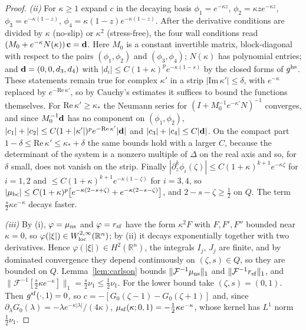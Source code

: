 \begin{proof}
\emph{(ii)} For $\kappa\ge1$ expand $c$ in the decaying basis $\phi_1=e^{-\kappa z}$, $\phi_2=\kappa ze^{-\kappa z}$,
$\phi_3=e^{-\kappa(1-z)}$, $\phi_4=\kappa(1-z)e^{-\kappa(1-z)}$. After the derivative conditions are divided by
$\kappa$ (no-slip) or $\kappa^2$ (stress-free), the four wall conditions read $(M_0+e^{-\kappa}N(\kappa))\,{\bf c}=
{\bf d}$. Here $M_0$ is a constant invertible matrix, block-diagonal with respect to the pairs
$(\phi_1,\phi_2)$ and $(\phi_3,\phi_4)$; $N(\kappa)$ has polynomial entries; and ${\bf d}=(0,0,d_3,d_4)$ with
$|d_i|\le C(1+\kappa)^pe^{-\kappa(1-s)}$ by the closed forms of $g^{\rm hs}$. These statements remain true for
complex $\kappa'$ in a strip $|\mathrm{Im}\,\kappa'|\le\delta$, with $e^{-\kappa}$ replaced by $e^{-\mathrm{Re}\,\kappa'}$,
so by Cauchy's estimates it suffices to bound the functions themselves. For $\mathrm{Re}\,\kappa'\ge\kappa_*$ the
Neumann series for $(I+M_0^{-1}e^{-\kappa'}N)^{-1}$ converges, and since $M_0^{-1}{\bf d}$ has no component on
$(\phi_1,\phi_2)$, $|c_1|+|c_2|\le C(1+|\kappa'|)^pe^{-\mathrm{Re}\,\kappa'}|{\bf d}|$ and $|c_3|+|c_4|\le C|{\bf d}|$.
On the compact part $1-\delta\le\mathrm{Re}\,\kappa'\le\kappa_*+\delta$ the same bounds hold with a larger $C$, because the
determinant of the system is a nonzero multiple of $\Delta$ on the real axis and so, for $\delta$ small, does not
vanish on the strip. Finally $|\partial_z^k\phi_i(\zeta)|\le C(1+\kappa)^{k+1}e^{-\kappa\zeta}$ for $i=1,2$ and
$\le C(1+\kappa)^{k+1}e^{-\kappa(1-\zeta)}$ for $i=3,4$, so
$|\mu_{\rm bc}|\le C(1+\kappa)^p\big[e^{-\kappa(2-s+\zeta)}+e^{-\kappa(2-s-\zeta)}\big]$, and $2-s-\zeta\ge\frac12$ on $Q$.
The term $\frac s2\kappa e^{-\kappa}$ decays faster.

\emph{(iii)} By (i), $\varphi=\mu_{\rm ns}$ and $\varphi=r_{\rm sf}$ have the form $\kappa^2F$ with $F,F',F''$ bounded
near $\kappa=0$, so $\varphi(|\xi|)\in W^{2,\infty}_{\rm loc}(\mathbb R^n)$; by (ii) it decays exponentially together
with two derivatives. Hence $\varphi(|\xi|)\in H^2(\mathbb R^n)$, the integrals $I_j$, $J_j$ are finite, and by dominated
convergence they depend continuously on $(\zeta,s)\in Q$, so they are bounded on $Q$. Lemma~\ref{lem:carlson} bounds
$\|\mathcal F^{-1}\mu_{\rm ns}\|_1$ and $\|\mathcal F^{-1}r_{\rm sf}\|_1$, and
$\|\mathcal F^{-1}[\frac s2\kappa e^{-\kappa}]\|_1=\frac s2\nu_1\le\frac12\nu_1$. For the lower bound take $(\zeta,s)=(0,1)$.
Then $g^{\rm sf}(\cdot,1)=0$, so $c=-[G_0(\zeta-1)-G_0(\zeta+1)]$ and, since $\partial_\lambda G_0(\lambda)=
-\lambda e^{-\kappa|\lambda|}/(4\kappa)$, $\mu_{\rm sf}(\kappa;0,1)=-\frac12\kappa e^{-\kappa}$, whose kernel has $L^1$ norm
$\frac12\nu_1$.
\end{proof}

